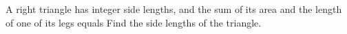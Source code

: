 A right triangle has integer side lengths, and the sum of its area and the length of one of its legs equals  Find the side lengths of the triangle.